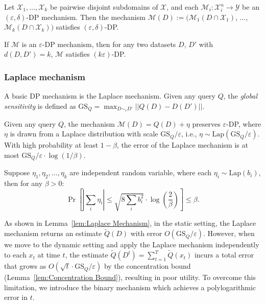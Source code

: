 \begin{lemma} 
\label{lem:Parallel Composition}
    Let $ \mathcal{X}_1, \dots, \mathcal{X}_k $ be pairwise disjoint subdomains of $ \mathcal{X} $, and each $ \mathcal{M}_i : \mathcal{X}^n_i \to \mathcal{Y} $ be an $(\varepsilon, \delta)$-DP mechanism. Then the mechanism $ \mathcal{M}(D) := (\mathcal{M}_1\left(D \cap \mathcal{X}_1 \right)$, $\dots$, $\mathcal{M}_k \left(D \cap \mathcal{X}_k \right))$ satisfies $(\varepsilon, \delta)$-DP.
\end{lemma}

\begin{lemma} 
\label{lem:Group Privacy}
    If $\mathcal{M}$ is an $\varepsilon$-DP mechanism, then for any two datasets $D$, $D'$ with $d(D,D')=k$, $\mathcal{M}$ satisfies $(k\varepsilon)$-DP.
\end{lemma}

\subsubsection{Laplace mechanism} 
A basic DP mechanism is the Laplace mechanism. Given any query $Q$, the \textit{global sensitivity} is defined as $\mathrm{GS}_Q = \max_{D\sim_rD'}||Q(D)-D(D')||$.
\begin{lemma}
\label{lem:Laplace Mechanism}
    Given any query $Q$, the mechanism $\mathcal{M}(D) = Q(D) + \eta$ preserves $\varepsilon$-DP, where $\eta$ is drawn from a Laplace distribution with scale $\mathrm{GS}_Q/\varepsilon$, i.e., $\eta \sim \mathrm{Lap}(\mathrm{GS}_Q/\varepsilon)$. With high probability at least $1-\beta$, the error of the Laplace mechanism is at most $\textrm{GS}_Q/\varepsilon\cdot \log (1/\beta)$.
\end{lemma}

\begin{lemma}
\label{lem:Concentration Bound}
    Suppose $\eta_1,\eta_2,\dots,\eta_k$ are independent random variable, where each $\eta_i \sim \mathrm{Lap}(b_i)$, then for any $\beta>0$:
    \[
    \Pr\left[ \left| \sum_i\eta_i \right| \le \sqrt{8\sum_i b_i^2} \cdot \log (\frac{2}{\beta})\right] \le \beta.
    \]
\end{lemma}

As shown in Lemma~\ref{lem:Laplace Mechanism}, in the static setting, the Laplace mechanism returns an estimate $\tilde{Q}(D)$ with error $O(\textrm{GS}_Q/\varepsilon)$. 
However, when we move to the dynamic setting and apply the Laplace mechanism independently to each $x_t$ at time $t$, the estimate $\tilde{Q}(D^t) = \sum_{t=1}^T \tilde{Q}(x_t)$ incurs a total error that grows as $O(\sqrt{t} \cdot \textrm{GS}_Q/\varepsilon)$ by the concentration bound (Lemma~\ref{lem:Concentration Bound}), resulting in poor utility.
To overcome this limitation, we introduce the binary mechanism which achieves a polylogarithmic error in $t$.

